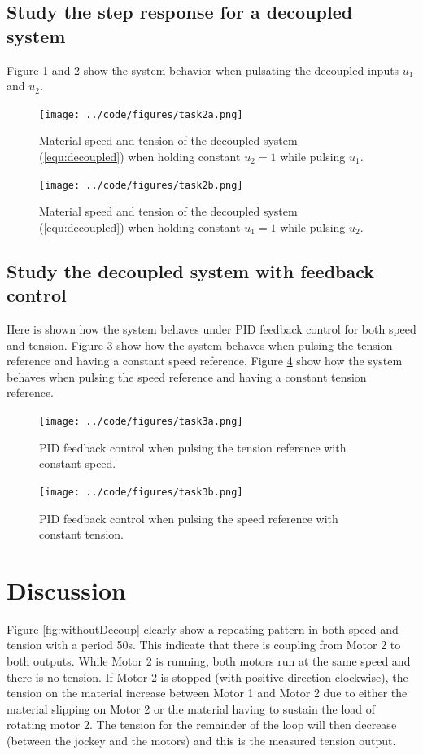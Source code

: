 \documentclass[a4paper, titlepage]{article}
\begin{document}
\subsection{Study the step response for a decoupled system}
Figure \ref{fig:withDecoupSpeedA} and \ref{fig:withDecoupSpeedB} show the system behavior when pulsating the decoupled inputs $u_1$ and $u_2$.

\begin{figure}[H]
\center
\texttt{[image: ../code/figures/task2a.png]}
\caption{Material speed and tension of the decoupled system (\ref{equ:decoupled}) when holding constant $u_2 = 1$ while pulsing $u_1$.}
\label{fig:withDecoupSpeedA}
\end{figure}

\begin{figure}[H]
\center
\texttt{[image: ../code/figures/task2b.png]}
\caption{Material speed and tension of the decoupled system (\ref{equ:decoupled}) when holding constant $u_1 = 1$ while pulsing $u_2$.}
\label{fig:withDecoupSpeedB}
\end{figure}


\subsection{Study the decoupled system with feedback control}
Here is shown how the system behaves under PID feedback control for both speed and tension.
Figure \ref{fig:withFeedbackDecoupSpeedA} show how the system behaves when pulsing the tension reference and having a constant speed reference.
Figure \ref{fig:withFeedbackDecoupSpeedB} show how the system behaves when pulsing the speed reference and having a constant tension reference.

\begin{figure}[H]
\center
\texttt{[image: ../code/figures/task3a.png]}
\caption{PID feedback control when pulsing the tension reference with constant speed.}
\label{fig:withFeedbackDecoupSpeedA}
\end{figure}

\begin{figure}[H]
\center
\texttt{[image: ../code/figures/task3b.png]}
\caption{PID feedback control when pulsing the speed reference with constant tension.}
\label{fig:withFeedbackDecoupSpeedB}
\end{figure}


\section{Discussion}
Figure \ref{fig:withoutDecoup} clearly show a repeating pattern in both speed and tension with a period 50s.
This indicate that there is coupling from Motor 2 to both outputs.
While Motor 2 is running, both motors run at the same speed and there is no tension.
If Motor 2 is stopped (with positive direction clockwise), the tension on the material increase between Motor 1 and Motor 2 due to either the material slipping on Motor 2 or the material having to sustain the load of rotating motor 2.
The tension for the remainder of the loop will then decrease (between the jockey and the motors) and this is the measured tension output.
\end{document}

